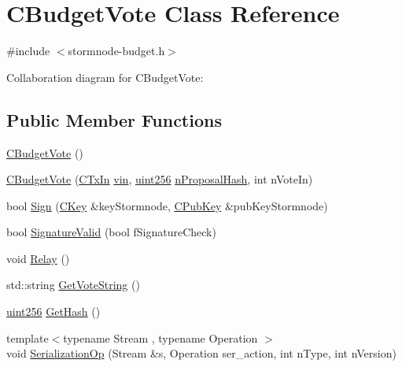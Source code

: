 \hypertarget{class_c_budget_vote}{}\section{C\+Budget\+Vote Class Reference}
\label{class_c_budget_vote}


{\ttfamily \#include $<$stormnode-\/budget.\+h$>$}



Collaboration diagram for C\+Budget\+Vote\+:
\subsection*{Public Member Functions}
\begin{DoxyCompactItemize}
\item 
\hyperlink{class_c_budget_vote_ad9e95972416105cd86c97ddfd6a035cb}{C\+Budget\+Vote} ()
\item 
\hyperlink{class_c_budget_vote_ae6c7bba44af43bbeb1a33f830e0b352e}{C\+Budget\+Vote} (\hyperlink{class_c_tx_in}{C\+Tx\+In} \hyperlink{class_c_budget_vote_a335d3b479d57994097eccb52b50cbe53}{vin}, \hyperlink{classuint256}{uint256} \hyperlink{class_c_budget_vote_a185648d07f641e8d663afcbf7a7c1a24}{n\+Proposal\+Hash}, int n\+Vote\+In)
\item 
bool \hyperlink{class_c_budget_vote_a112c52bed648dd66fe2898e002fc3f09}{Sign} (\hyperlink{class_c_key}{C\+Key} \&key\+Stormnode, \hyperlink{class_c_pub_key}{C\+Pub\+Key} \&pub\+Key\+Stormnode)
\item 
bool \hyperlink{class_c_budget_vote_ab01d2ab30c3761318a7da919bff26697}{Signature\+Valid} (bool f\+Signature\+Check)
\item 
void \hyperlink{class_c_budget_vote_a2c761ac435fa5a5da6ccbeb308350a8f}{Relay} ()
\item 
std\+::string \hyperlink{class_c_budget_vote_a97d8f521e59d47b70203515271ecd2fc}{Get\+Vote\+String} ()
\item 
\hyperlink{classuint256}{uint256} \hyperlink{class_c_budget_vote_acb9bda3b41d3bd1ebf04ccdcb3d2d926}{Get\+Hash} ()
\item 
{\footnotesize template$<$typename Stream , typename Operation $>$ }\\void \hyperlink{class_c_budget_vote_a9899da97644defecdd4d64984cdbcd97}{Serialization\+Op} (Stream \&s, Operation ser\+\_\+action, int n\+Type, int n\+Version)
\end{DoxyCompactItemize}
